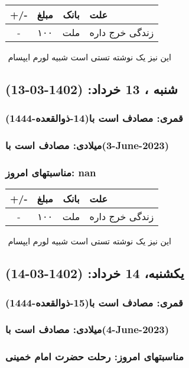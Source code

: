 \documentclass{article}
\newcommand{\rnote}[1]{\marginpar{\textcolor{color}{\StrSubstitute{\##1}{ }{\_}}}}
\newcommand{\myRow}[4]{
    #1 & #2 & #3 & #4 \\ \hline
}
\begin{document}
\begin{tabular}{ | c | c | c | p{5cm} |}
    \hline
    \myRow{ +/- }{مبلغ}{بانک}{علت}
    \myRow{-}{۱۰۰}{ملت}{زندگی خرج داره}
\end{tabular}
\newline
\newline

‌
\rnote{تست}
این نیز یک نوشته تستی است شبیه لورم ایپسام




\newpage
{}
\textcolor{color}{
\section{ شنبه ، 13 خرداد: (1402-03-13) }
\subsubsection*{قمری: مصادف است با(14-ذوالقعده-1444)} 
\subsubsection*{میلادی: مصادف است با(3-June-2023)}
\subsubsection*{مناسبتهای امروز: nan}
}


\begin{tabular}{ | c | c | c | p{5cm} |}
    \hline
    \myRow{ +/- }{مبلغ}{بانک}{علت}
    \myRow{-}{۱۰۰}{ملت}{زندگی خرج داره}
\end{tabular}
\newline
\newline

‌
\rnote{تست}
این نیز یک نوشته تستی است شبیه لورم ایپسام




\newpage
{}
\textcolor{color}{
\section{ یکشنبه، 14 خرداد: (1402-03-14) }
\subsubsection*{قمری: مصادف است با(15-ذوالقعده-1444)} 
\subsubsection*{میلادی: مصادف است با(4-June-2023)}
\subsubsection*{مناسبتهای امروز: رحلت حضرت امام خمینی}
}
\end{document}
